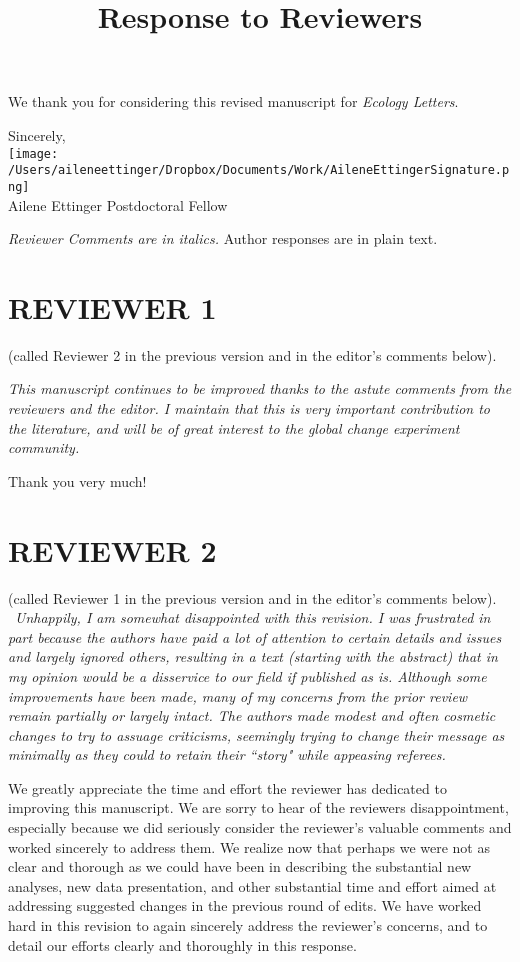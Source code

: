 \documentclass[11pt,a4paper]{letter}
\begin{document}
\begin{letter}{}
We thank you for considering this revised manuscript for \emph{Ecology Letters}.

Sincerely,\\

\texttt{[image: /Users/aileneettinger/Dropbox/Documents/Work/AileneEttingerSignature.png]} \\
Ailene Ettinger
Postdoctoral Fellow

\clearpage

\title{Response to Reviewers}
 \emph{Reviewer Comments are in italics.} Author responses are in plain text.

\section {REVIEWER 1} (called Reviewer 2 in the previous version and in the editor's comments below).

\emph{This manuscript continues to be improved thanks to the astute comments from the reviewers and the editor.  I maintain  that this is very important contribution to the literature, and will be of great interest to the global change experiment community.} 

\par Thank you very much!

\section {REVIEWER 2} (called Reviewer 1 in the previous version and in the editor's comments below).
\\\
\emph{Unhappily, I am somewhat disappointed with this revision. I was frustrated in
part because the authors have paid a lot of attention to certain details and
issues and largely ignored others, resulting in a text (starting with the abstract)
that in my opinion would be a disservice to our field if published as is.
Although some improvements have been made, many of my concerns from
the prior review remain partially or largely intact. The authors made modest
and often cosmetic changes to try to assuage criticisms, seemingly trying to
change their message as minimally as they could to retain their ``story" while
appeasing referees.}

\par We greatly appreciate the time and effort the reviewer has dedicated to improving this manuscript.
We are sorry to hear of the reviewers disappointment, especially because we did seriously consider the reviewer's valuable comments and worked sincerely to address them. We realize now that perhaps we were not as clear and thorough as we could have been in describing the substantial new analyses, new data presentation, and other substantial time and effort aimed at addressing suggested changes in the previous round of edits. We have worked hard in this revision to again sincerely address the reviewer's concerns, and to detail our efforts clearly and thoroughly in this response. 


\end{letter}
\end{document}
